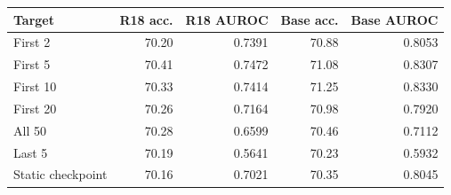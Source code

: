 \begin{tabular}{lrrrr}
\toprule
Target & R18 acc. & R18 AUROC & Base acc. & Base AUROC \\
\midrule
First 2 & 70.20 & 0.7391 & 70.88 & 0.8053 \\
First 5 & 70.41 & 0.7472 & 71.08 & 0.8307 \\
First 10 & 70.33 & 0.7414 & 71.25 & 0.8330 \\
First 20 & 70.26 & 0.7164 & 70.98 & 0.7920 \\
All 50 & 70.28 & 0.6599 & 70.46 & 0.7112 \\
Last 5 & 70.19 & 0.5641 & 70.23 & 0.5932 \\
Static checkpoint & 70.16 & 0.7021 & 70.35 & 0.8045 \\
\bottomrule
\end{tabular}
